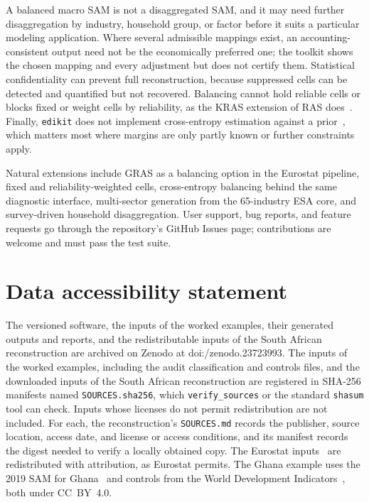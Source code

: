 \documentclass[11pt,a4paper]{article}
\newcommand{\versiondoi}{10.5281/zenodo.23723993}
\begin{document}
A balanced macro SAM is not a
disaggregated SAM, and it may need further disaggregation by industry,
household group, or factor before it suits a particular modeling
application. Where several admissible mappings exist, an
accounting-consistent output need not be the economically preferred one;
the toolkit shows the chosen mapping and every adjustment but does not
certify them. Statistical confidentiality can prevent full
reconstruction, because suppressed cells can be detected and quantified
but not recovered. Balancing
cannot hold reliable cells or blocks fixed or weight cells by reliability,
as the KRAS extension of RAS does~\cite{lenzen2009}. Finally, \texttt{edikit} does not
implement cross-entropy estimation against a prior~\cite{robinson2001},
which matters most where margins are only partly known or further
constraints apply.

Natural extensions include GRAS as a balancing option in the Eurostat
pipeline, fixed and reliability-weighted cells, cross-entropy balancing
behind the same diagnostic interface, multi-sector generation from the
65-industry ESA core, and survey-driven household disaggregation. User
support, bug reports, and feature requests go through the repository's
GitHub Issues page; contributions are welcome and must pass the test
suite.

\section*{Data accessibility statement}
The versioned software, the inputs of the worked examples, their generated
outputs and reports, and the redistributable inputs of the South African
reconstruction are archived on Zenodo at doi:\allowbreak\versiondoi. The inputs of the worked
examples, including the audit classification and controls files, and the
downloaded inputs of the South African reconstruction are registered in SHA-256 manifests
named \texttt{SOURCES.sha256}, which \texttt{verify\_sources} or the
standard \texttt{shasum} tool can check. Inputs whose licenses do not permit
redistribution are not included. For each, the reconstruction's
\texttt{SOURCES.md} records the publisher, source location, access date,
and license or access conditions, and its manifest records the digest
needed to verify a locally obtained copy. The Eurostat inputs~\cite{eurostat_naio15,eurostat_naio16,eurostat_nasa} are redistributed
with attribution, as Eurostat permits. The Ghana example uses the 2019 SAM
for Ghana~\cite{gss2023ghana,gss2023ghanapaper} and controls from the
World Development Indicators~\cite{worldbank2026wdi}, both under
CC~BY~4.0.
\end{document}
